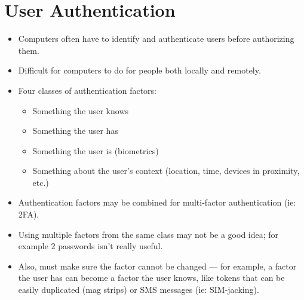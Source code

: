 \documentclass{article}
\begin{document}
\section{User Authentication}
\begin{itemize}
    \item Computers often have to identify and authenticate users before authorizing them.
    \item Difficult for computers to do for people both locally and remotely.
    \item Four classes of authentication factors:
        \begin{itemize}
            \item Something the user knows
            \item Something the user has
            \item Something the user is (biometrics)
            \item Something about the user's context (location, time, devices in proximity, etc.)
        \end{itemize}
    \item Authentication factors may be combined for multi-factor authentication (ie: 2FA).
    \item Using multiple factors from the same class may not be a good idea; for example 2 passwords isn't really useful.
    \item Also, must make sure the factor cannot be changed --- for example, a factor the user has can become a factor the user knows, like tokens that can be easily duplicated (mag strips) or SMS messages (ie: SIM-jacking).
\end{itemize}
\end{document}
